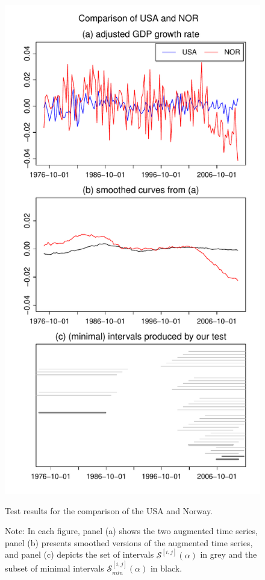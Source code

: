 \documentclass[a4paper,12pt]{article}
\begin{document}
\begin{figure}[t!]
\begin{minipage}[t]{0.49\textwidth}
\includegraphics[width=\textwidth]{Plots/gdp/USA_vs_NOR}
\caption{Test results for the comparison of the USA and Norway.}\label{fig:USA:Norway}
\end{minipage}
\caption*{Note: In each figure, panel (a) shows the two augmented time series, panel (b) presents smoothed versions of the augmented time series, and panel (c) depicts the set of intervals $\mathcal{S}^{[i, j]}(\alpha)$ in grey and the subset of minimal intervals $\mathcal{S}^{[i, j]}_{min}(\alpha)$ in black.}
\end{figure}
\end{document}
